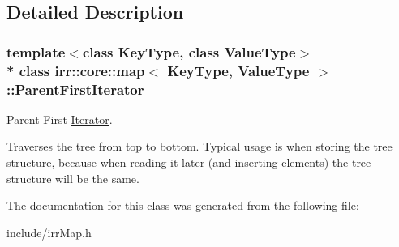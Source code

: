 \subsection{Detailed Description}
\subsubsection*{template$<$class Key\+Type, class Value\+Type$>$\\*
class irr\+::core\+::map$<$ Key\+Type, Value\+Type $>$\+::\+Parent\+First\+Iterator}

Parent First \hyperlink{classirr_1_1core_1_1map_1_1Iterator}{Iterator}. 

Traverses the tree from top to bottom. Typical usage is when storing the tree structure, because when reading it later (and inserting elements) the tree structure will be the same. 

The documentation for this class was generated from the following file\+:\begin{DoxyCompactItemize}
\item 
include/irr\+Map.\+h\end{DoxyCompactItemize}
